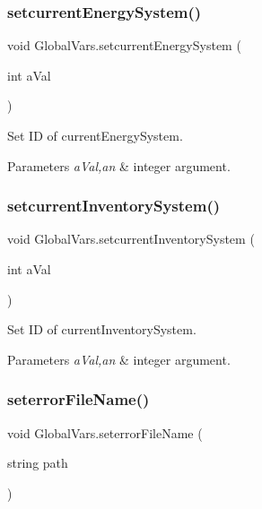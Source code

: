 \subsubsection{\texorpdfstring{setcurrentEnergySystem()}{setcurrentEnergySystem()}}
{\footnotesize\ttfamily void Global\+Vars.\+setcurrent\+Energy\+System (\begin{DoxyParamCaption}\item[{int}]{a\+Val }\end{DoxyParamCaption})\hspace{0.3cm}{\ttfamily [inline]}}



Set ID of current\+Energy\+System. 


\begin{DoxyParams}{Parameters}
{\em a\+Val,an} & integer argument. \\
\hline
\end{DoxyParams}
\mbox{\label{class_global_vars_a7aae0cfed8bbdf1ed6e57dbc3543ac7f}} 
\subsubsection{\texorpdfstring{setcurrentInventorySystem()}{setcurrentInventorySystem()}}
{\footnotesize\ttfamily void Global\+Vars.\+setcurrent\+Inventory\+System (\begin{DoxyParamCaption}\item[{int}]{a\+Val }\end{DoxyParamCaption})\hspace{0.3cm}{\ttfamily [inline]}}



Set ID of current\+Inventory\+System. 


\begin{DoxyParams}{Parameters}
{\em a\+Val,an} & integer argument. \\
\hline
\end{DoxyParams}
\mbox{\label{class_global_vars_ace9170eba61644f40c5689d021e7ac8b}} 
\subsubsection{\texorpdfstring{seterrorFileName()}{seterrorFileName()}}
{\footnotesize\ttfamily void Global\+Vars.\+seterror\+File\+Name (\begin{DoxyParamCaption}\item[{string}]{path }\end{DoxyParamCaption})\hspace{0.3cm}{\ttfamily [inline]}}



